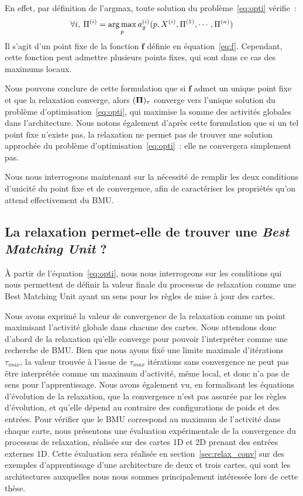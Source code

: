 \documentclass[../main]{subfiles}
\begin{document}
En effet, par définition de l'argmax, toute solution du problème~\ref{eq:opti} vérifie~:
$$\forall i, \: \Pi^{({i})} = \operatorname*{arg\,max}\limits_p a_g^{({i})}(p, X^{({i})}, \Pi^{({1})}, \cdots, \Pi^{({n})})$$
Il s'agit d'un point fixe de la fonction $\mathbf{f}$ définie en équation~\ref{eq:f}.
Cependant, cette fonction peut admettre plusieurs points fixes, qui sont dans ce cas des maximums locaux. 

Nous pouvons conclure de cette formulation que si $\mathbf{f}$ admet un unique point fixe et que la relaxation converge, alors $(\mathbf{\Pi})_\tau$ converge vers l'unique solution du problème d'optimisation~\ref{eq:opti}, qui maximise la somme des activités globales dans l'architecture.
Nous notons également d'après cette formulation que si un tel point fixe n'existe pas, la relaxation ne permet pas de trouver une solution approchée du problème d'optimisation~\ref{eq:opti}~: elle ne convergera simplement pas.

Nous nous interrogeons maintenant sur la nécessité de remplir les deux conditions d'unicité du point fixe et de convergence, afin de caractériser les propriétés qu'on attend effectivement du BMU.

\subsection{La relaxation permet-elle de trouver une \og \emph{Best Matching Unit} \fg{} ?}

\`A partir de l'équation~\ref{eq:opti}, nous nous interrogeons sur les conditions qui nous permettent de définir la valeur finale du processus de relaxation comme une \og Best Matching Unit \fg{} ayant un sens pour les règles de mise à jour des cartes.

Nous avons exprimé la valeur de convergence de la relaxation comme un point maximisant l'activité globale dans chacune des cartes. 
Nous attendons donc d'abord de la relaxation qu'elle converge pour pouvoir l'interpréter comme une recherche de BMU. 
Bien que nous ayons fixé une limite maximale d'itérations $\tau_{max}$, la valeur trouvée à l'issue de $\tau_{max}$ itérations sans convergence ne peut pas être interprétée comme un maximum d'activité, même local, et donc n'a pas de sens pour l'apprentissage. Nous avons également vu, en formalisant les équations d'évolution de la relaxation, que la convergence n'est pas assurée par les règles d'évolution, et qu'elle dépend au contraire des configurations de poids et des entrées.
Pour vérifier que le BMU correspond au maximum de l'activité dans chaque carte, nous présentons une évaluation expérimentale de la convergence du processus de relaxation, réalisée sur des cartes 1D et 2D prenant des entrées externes 1D.
Cette évaluation sera réalisée en section~\ref{sec:relax_conv} sur des exemples d'apprentissage d'une architecture de deux et trois cartes, qui sont les architectures auxquelles nous nous sommes principalement intéressée lors de cette thèse.
\end{document}
